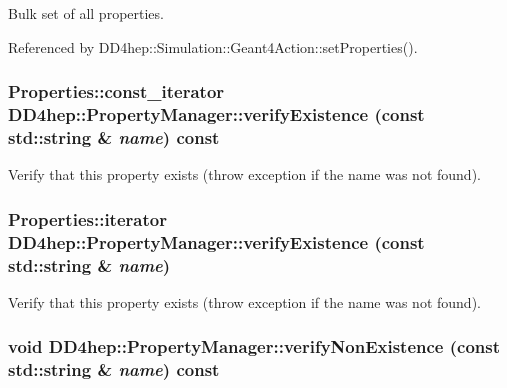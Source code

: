 Bulk set of all properties. 

Referenced by DD4hep::Simulation::Geant4Action::setProperties().\hypertarget{class_d_d4hep_1_1_property_manager_a47a4cd2669b54050491dc52ea688212c}{
\subsubsection[{verifyExistence}]{\setlength{\rightskip}{0pt plus 5cm}Properties::const\_\-iterator DD4hep::PropertyManager::verifyExistence (const std::string \& {\em name}) const}}
\label{class_d_d4hep_1_1_property_manager_a47a4cd2669b54050491dc52ea688212c}


Verify that this property exists (throw exception if the name was not found). \hypertarget{class_d_d4hep_1_1_property_manager_a6c6a752bab81f32aeac935aa75270bbb}{
\subsubsection[{verifyExistence}]{\setlength{\rightskip}{0pt plus 5cm}Properties::iterator DD4hep::PropertyManager::verifyExistence (const std::string \& {\em name})}}
\label{class_d_d4hep_1_1_property_manager_a6c6a752bab81f32aeac935aa75270bbb}


Verify that this property exists (throw exception if the name was not found). \hypertarget{class_d_d4hep_1_1_property_manager_a2175a64911355eb33720acbac096a789}{
\subsubsection[{verifyNonExistence}]{\setlength{\rightskip}{0pt plus 5cm}void DD4hep::PropertyManager::verifyNonExistence (const std::string \& {\em name}) const}}
\label{class_d_d4hep_1_1_property_manager_a2175a64911355eb33720acbac096a789}


